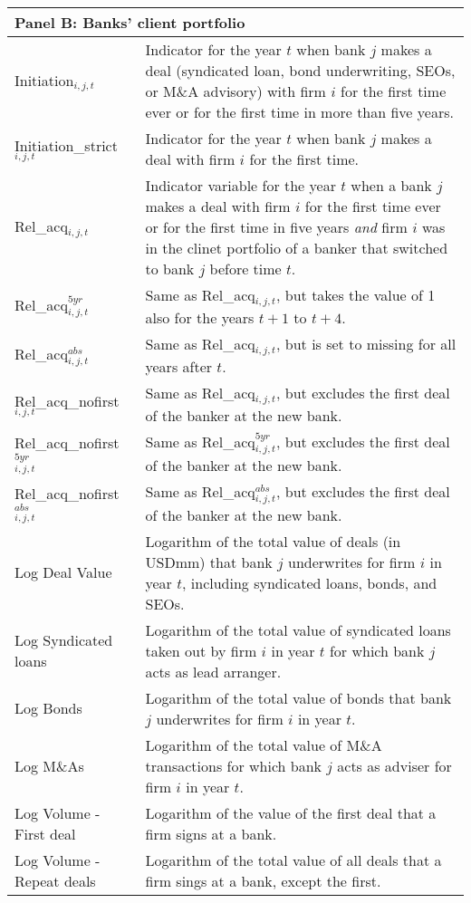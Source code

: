 \begin{landscape}
\begin{longtable}[c]{p{} p{} }
 	\multicolumn{2}{l}{\textbf{Panel B:} Banks' client portfolio} \\
 	\midrule
 	Initiation$_{i,j,t}$ & Indicator for the year $t$ when bank $j$ makes a deal (syndicated loan, bond underwriting, SEOs, or M\&A advisory) with firm $i$ for the first time ever or for the first time in more than five years. \\
 	Initiation\_strict$_{i,j,t}$ & Indicator for the year $t$ when bank $j$ makes a deal with firm $i$ for the first time.  \\
 	Rel\_acq$_{i,j,t}$ & Indicator variable for the year $t$ when a bank $j$ makes a deal with firm $i$ for the first time ever or for the first time in five years \emph{and} firm $i$ was in the clinet portfolio of a banker that switched to bank $j$ before time $t$.  \\
	Rel\_acq$^{5yr}_{i,j,t}$ & Same as Rel\_acq$_{i,j,t}$, but takes the value of 1 also for the years $t+1$ to $t+4$. \\
	Rel\_acq$^{abs}_{i,j,t}$ & Same as Rel\_acq$_{i,j,t}$, but is set to missing for all years after $t$. \\
	Rel\_acq\_nofirst$_{i,j,t}$ & Same as Rel\_acq$_{i,j,t}$, but excludes the first deal of the banker at the new bank. \\
	Rel\_acq\_nofirst$^{5yr}_{i,j,t}$ & Same as Rel\_acq$^{5yr}_{i,j,t}$, but excludes the first deal of the banker at the new bank. \\
	Rel\_acq\_nofirst$^{abs}_{i,j,t}$ & Same as Rel\_acq$^{abs}_{i,j,t}$, but excludes the first deal of the banker at the new bank. \\
	Log Deal Value & Logarithm of the total value of deals (in USDmm) that bank $j$ underwrites for firm $i$ in year $t$, including syndicated loans, bonds, and SEOs.  \\
	Log Syndicated loans & Logarithm of the total value of syndicated loans taken out by firm $i$ in year $t$ for which bank $j$ acts as lead arranger. \\
	Log Bonds & Logarithm of the total value of bonds that bank $j$ underwrites for firm $i$ in year $t$. \\
	Log M\&As & Logarithm of the total value of M\&A transactions for which bank $j$ acts as adviser for firm $i$ in year $t$. \\
	Log Volume - First deal & Logarithm of the value of the first deal that a firm signs at a bank. \\
	Log Volume - Repeat deals & Logarithm of the total value of all deals that a firm sings at a bank, except the first. \\


\end{longtable}
\end{landscape}
